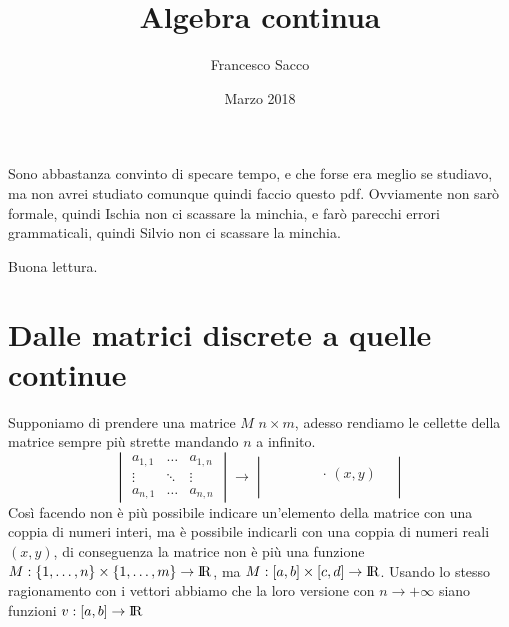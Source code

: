 \documentclass[11pt,a4paper]{article}
\date{Marzo 2018}
\title{Algebra continua}
\author{Francesco Sacco}
\theoremstyle{definition}
\theoremstyle{plain}
\theoremstyle{plain}
\begin{document}
	\maketitle
	Sono abbastanza convinto di specare tempo, e che forse era meglio se studiavo, ma non avrei studiato comunque quindi faccio questo pdf.\newline
	Ovviamente non sarò formale, quindi Ischia non ci scassare la minchia, e farò parecchi errori grammaticali, quindi Silvio non ci scassare la minchia.\newline

	Buona lettura.
	

	\section{Dalle matrici discrete a quelle continue}
		Supponiamo di prendere una matrice $M$ $ n \times m$, adesso rendiamo le cellette della matrice sempre più strette mandando $n$ a infinito.
		\begin{equation}
			\begin{vmatrix}
				a_{1,1} & \dots & a_{1,n} \\
				\vdots	&	\ddots&	\vdots	\\
				a_{n,1} & \dots & a_{n,n} 
			\end{vmatrix}
			\longrightarrow
			\begin{vmatrix}
				&\quad & & \\
				&\ &\quad \cdot \, (x,y) & \\
				& & & \\
			\end{vmatrix}
		\end{equation}
		Così facendo non è più possibile indicare un'elemento della matrice con una coppia di numeri interi, ma è possibile indicarli con una coppia di numeri reali $(x,y)$, di  conseguenza la matrice non è più una funzione $M:\{1,\dots,n\}\times\{1,\dots,m\} \rightarrow \rm I\!R$, ma $M:[a,b]\times [c,d]\rightarrow \rm I\!R$.\newline
		Usando lo stesso ragionamento con i vettori abbiamo che la loro versione con $n\rightarrow +\infty$ siano funzioni $v:[a,b]\rightarrow \rm I\!R$ 
	
\end{document}
